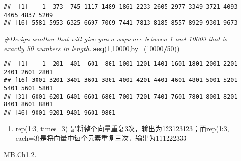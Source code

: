 \documentclass[
]{article}
\newenvironment{Shaded}{\begin{snugshade}}{\end{snugshade}}
\newcommand{\AttributeTok}[1]{\textcolor[rgb]{0.13,0.29,0.53}{#1}}
\newcommand{\CommentTok}[1]{\textcolor[rgb]{0.56,0.35,0.01}{\textit{#1}}}
\newcommand{\DecValTok}[1]{\textcolor[rgb]{0.00,0.00,0.81}{#1}}
\newcommand{\FunctionTok}[1]{\textcolor[rgb]{0.13,0.29,0.53}{\textbf{#1}}}
\newcommand{\NormalTok}[1]{#1}
\newcommand{\OtherTok}[1]{\textcolor[rgb]{0.56,0.35,0.01}{#1}}
\newcommand{\SpecialCharTok}[1]{\textcolor[rgb]{0.81,0.36,0.00}{\textbf{#1}}}
\newcommand{\StringTok}[1]{\textcolor[rgb]{0.31,0.60,0.02}{#1}}
\providecommand{\tightlist}{%
  \setlength{\itemsep}{0pt}\setlength{\parskip}{0pt}}
\begin{document}
\begin{enumerate}
\begin{verbatim}
##  [1]    1  373  745 1117 1489 1861 2233 2605 2977 3349 3721 4093 4465 4837 5209
## [16] 5581 5953 6325 6697 7069 7441 7813 8185 8557 8929 9301 9673
\end{verbatim}

\begin{Shaded}
\begin{Highlighting}[]
\CommentTok{\#Design another that will give you a sequence between 1 and 10000 that is exactly 50 numbers in length.}
\FunctionTok{seq}\NormalTok{(}\DecValTok{1}\NormalTok{,}\DecValTok{10000}\NormalTok{,}\AttributeTok{by=}\NormalTok{(}\DecValTok{10000}\SpecialCharTok{/}\DecValTok{50}\NormalTok{))}
\end{Highlighting}
\end{Shaded}

\begin{verbatim}
##  [1]    1  201  401  601  801 1001 1201 1401 1601 1801 2001 2201 2401 2601 2801
## [16] 3001 3201 3401 3601 3801 4001 4201 4401 4601 4801 5001 5201 5401 5601 5801
## [31] 6001 6201 6401 6601 6801 7001 7201 7401 7601 7801 8001 8201 8401 8601 8801
## [46] 9001 9201 9401 9601 9801
\end{verbatim}

  \begin{enumerate}
  \def\labelenumii{\alph{enumii}.}
  \setcounter{enumii}{1}
  \tightlist
  \item
    rep(1:3, times=3) 是将整个向量重复3次，输出为123123123；而rep(1:3,
    each=3)是将向量中每个元素重复三次，输出为111222333
  \end{enumerate}
\end{enumerate}

MB.Ch1.2.

\begin{Shaded}
\end{Shaded}
\end{document}
